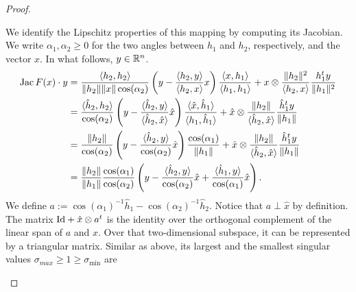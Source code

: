 \documentclass[10pt,letterpaper]{article}
\begin{document}
\begin{proof}
\begin{itemize}
        We identify the Lipschitz properties of this mapping by computing its Jacobian. 
        We write $\alpha_1, \alpha_2 \geq 0$ for the two angles between $h_1$ and $h_2$, respectively, and the vector $x$.
        In what follows, $y \in {\mathbb R}^{n}$.
        \begin{align*}
            \operatorname{{\rm Jac}} F(x) \cdot y
            &=
            \frac{ \langle h_2, h_2 \rangle }{ \|h_2\| \|x\| \cos(\alpha_2) }
            \left( y - \frac{ \langle h_2, y \rangle }{ \langle h_2, x \rangle } x \right)
            \frac{ \langle x, h_1 \rangle }{ \langle h_1, h_1 \rangle }
            +
            x
            \otimes 
            \frac{ \| h_2 \|^{2} }{ \langle h_2, x \rangle }
            \frac{ h_1^{t} y }{ \| h_1 \|^{2} }
            \\&=
            \frac{ \langle \hat h_2, h_2 \rangle }{ \cos(\alpha_2) }
            \left( y - \frac{ \langle \hat h_2, y \rangle }{ \langle \hat h_2, \hat x \rangle } \hat x \right)
            \frac{ \langle \hat x, \hat h_1 \rangle }{ \langle h_1, \hat h_1 \rangle }
            +
            \hat x
            \otimes 
            \frac{ \| h_2 \| }{ \langle \hat h_2, \hat x \rangle }
            \frac{ \hat h_1^{t} y }{ \| h_1 \| }
            \\&=
            \frac{ \| h_2 \| }{ \cos(\alpha_2) }
            \left( y - \frac{ \langle \hat h_2, y \rangle }{ \cos(\alpha_2) } \hat x \right)
            \frac{ \cos(\alpha_1) }{ \| h_1 \| }
            +
            \hat x
            \otimes 
            \frac{ \| h_2 \| }{ \langle \hat h_2, \hat x \rangle }
            \frac{ \hat h_1^{t} y }{ \| h_1 \| }
            \\&=
            \frac{ \| h_2 \| }{ \| h_1 \| }
            \frac{ \cos(\alpha_1) }{ \cos(\alpha_2) }
            \left( 
                y 
                - 
                \frac{ \langle \hat h_2, y \rangle }{ \cos(\alpha_2) } \hat x 
                + 
                \frac{ \langle \hat h_1, y \rangle }{ \cos(\alpha_1) } \hat x 
            \right)
            .
        \end{align*}
        We define $a := \cos(\alpha_1)^{-1} \hat h_1 - \cos(\alpha_2)^{-1} \hat h_2$. 
        Notice that $a \perp \hat x$ by definition. The matrix ${\rm Id} + \hat x \otimes a^{t}$ is the identity over the orthogonal complement of the linear span of $a$ and $x$. Over that two-dimensional subspace, it can be represented by a triangular matrix.
        Similar as above, its largest and the smallest singular values $\sigma_{max} \geq 1 \geq \sigma_{\min}$ are

\end{itemize}
\end{proof}
\end{document}
